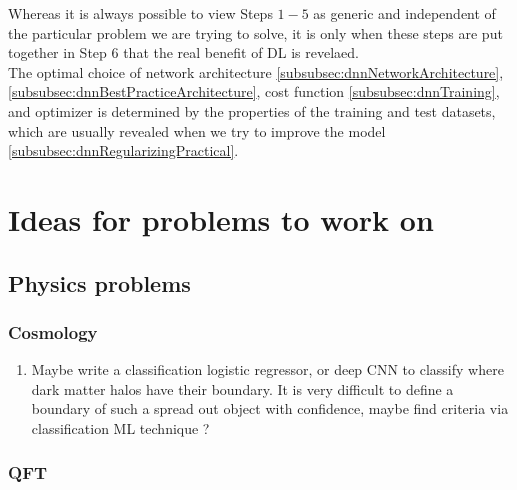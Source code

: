Whereas it is always possible to view Steps $1-5$ as generic and independent of the particular problem we are trying to solve, it is only when these steps are put together in Step $6$ that the real benefit of DL is revelaed.\\
The optimal choice of network architecture \ref{subsubsec:dnnNetworkArchitecture},\ref{subsubsec:dnnBestPracticeArchitecture}, cost function \ref{subsubsec:dnnTraining}, and optimizer is determined by the properties of the training and test datasets, which are usually revealed when we try to improve the model \ref{subsubsec:dnnRegularizingPractical}.












































\chapter{Ideas for problems to work on}
\section{Physics problems}
\subsection{Cosmology}
\begin{enumerate}
	\item Maybe write a classification logistic regressor, or deep CNN to classify where dark matter halos have their boundary. It is very difficult to define a boundary of such a spread out object with confidence, maybe find criteria via classification ML technique ?
\end{enumerate}
\subsection{QFT}